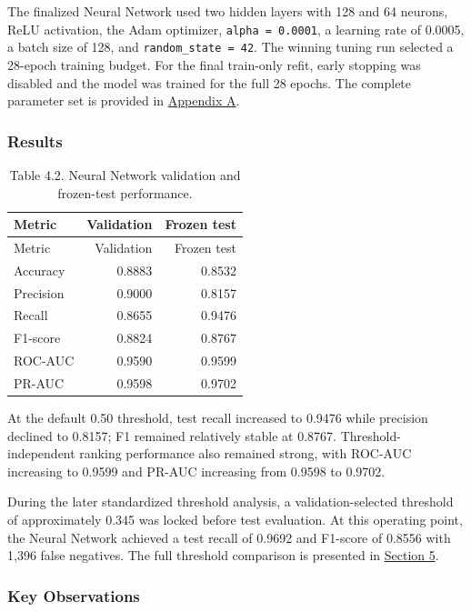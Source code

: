 \documentclass[
  canadian,
  12pt,
]{article}
\let\reportOrigSubsubsection\subsubsection
\renewcommand{\subsubsection}{\par\Needspace*{5\baselineskip}\reportOrigSubsubsection}%
\begin{document}
The finalized Neural Network used two hidden layers with 128 and 64
neurons, ReLU activation, the Adam optimizer, \texttt{alpha\ =\ 0.0001},
a learning rate of 0.0005, a batch size of 128, and
\texttt{random\_state\ =\ 42}. The winning tuning run selected a
28-epoch training budget. For the final train-only refit, early stopping
was disabled and the model was trained for the full 28 epochs. The
complete parameter set is provided in \hyperref[sec-app-a]{Appendix A}.

\subsubsection{Results}\label{sec-4-2-results}

\begin{longtable}[]{@{}lrr@{}}
\caption{Table 4.2. Neural Network validation and frozen-test
performance.}\tabularnewline
\toprule\noalign{}
Metric & Validation & Frozen test \\
\midrule\noalign{}
\endfirsthead
\toprule\noalign{}
Metric & Validation & Frozen test \\
\midrule\noalign{}
\endhead
\bottomrule\noalign{}
\endlastfoot
Accuracy & 0.8883 & 0.8532 \\
Precision & 0.9000 & 0.8157 \\
Recall & 0.8655 & 0.9476 \\
F1-score & 0.8824 & 0.8767 \\
ROC-AUC & 0.9590 & 0.9599 \\
PR-AUC & 0.9598 & 0.9702 \\
\end{longtable}

At the default 0.50 threshold, test recall increased to 0.9476 while
precision declined to 0.8157; F1 remained relatively stable at 0.8767.
Threshold-independent ranking performance also remained strong, with
ROC-AUC increasing to 0.9599 and PR-AUC increasing from 0.9598 to
0.9702.

During the later standardized threshold analysis, a validation-selected
threshold of approximately 0.345 was locked before test evaluation. At
this operating point, the Neural Network achieved a test recall of
0.9692 and F1-score of 0.8556 with 1,396 false negatives. The full
threshold comparison is presented in \hyperref[sec-5]{Section 5}.

\subsubsection{Key Observations}\label{key-observations-1}
\end{document}
